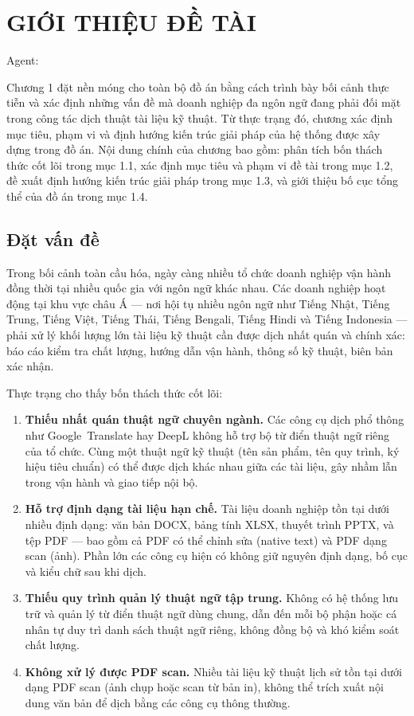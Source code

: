 \chapter{GIỚI THIỆU ĐỀ TÀI}

Agent:

Chương 1 đặt nền móng cho toàn bộ đồ án bằng cách trình bày bối cảnh thực tiễn và xác định những vấn đề mà doanh nghiệp đa ngôn ngữ đang phải đối mặt trong công tác dịch thuật tài liệu kỹ thuật. Từ thực trạng đó, chương xác định mục tiêu, phạm vi và định hướng kiến trúc giải pháp của hệ thống được xây dựng trong đồ án. Nội dung chính của chương bao gồm: phân tích bốn thách thức cốt lõi trong mục 1.1, xác định mục tiêu và phạm vi đề tài trong mục 1.2, đề xuất định hướng kiến trúc giải pháp trong mục 1.3, và giới thiệu bố cục tổng thể của đồ án trong mục 1.4.

\section{Đặt vấn đề}

Trong bối cảnh toàn cầu hóa, ngày càng nhiều tổ chức doanh nghiệp vận hành đồng thời tại
nhiều quốc gia với ngôn ngữ khác nhau. Các doanh nghiệp hoạt động tại khu vực châu Á --- nơi
hội tụ nhiều ngôn ngữ như Tiếng Nhật, Tiếng Trung, Tiếng Việt, Tiếng Thái, Tiếng Bengali,
Tiếng Hindi và Tiếng Indonesia --- phải xử lý khối lượng lớn tài liệu kỹ thuật cần được dịch
nhất quán và chính xác: báo cáo kiểm tra chất lượng, hướng dẫn vận hành, thông số kỹ thuật,
biên bản xác nhận.

Thực trạng cho thấy bốn thách thức cốt lõi:

\begin{enumerate}
  \item \textbf{Thiếu nhất quán thuật ngữ chuyên ngành.} Các công cụ dịch phổ thông như
    Google~Translate hay DeepL không hỗ trợ bộ từ điển thuật ngữ riêng của tổ chức. Cùng
    một thuật ngữ kỹ thuật (tên sản phẩm, tên quy trình, ký hiệu tiêu chuẩn) có thể được
    dịch khác nhau giữa các tài liệu, gây nhầm lẫn trong vận hành và giao tiếp nội bộ.

  \item \textbf{Hỗ trợ định dạng tài liệu hạn chế.} Tài liệu doanh nghiệp tồn tại dưới nhiều
    định dạng: văn bản DOCX, bảng tính XLSX, thuyết trình PPTX, và tệp PDF --- bao gồm cả
    PDF có thể chỉnh sửa (native text) và PDF dạng scan (ảnh). Phần lớn các công cụ hiện có
    không giữ nguyên định dạng, bố cục và kiểu chữ sau khi dịch.

  \item \textbf{Thiếu quy trình quản lý thuật ngữ tập trung.} Không có hệ thống lưu trữ và
    quản lý từ điển thuật ngữ dùng chung, dẫn đến mỗi bộ phận hoặc cá nhân tự duy trì
    danh sách thuật ngữ riêng, không đồng bộ và khó kiểm soát chất lượng.

  \item \textbf{Không xử lý được PDF scan.} Nhiều tài liệu kỹ thuật lịch sử tồn tại dưới
    dạng PDF scan (ảnh chụp hoặc scan từ bản in), không thể trích xuất nội dung văn bản để
    dịch bằng các công cụ thông thường.
\end{enumerate}

